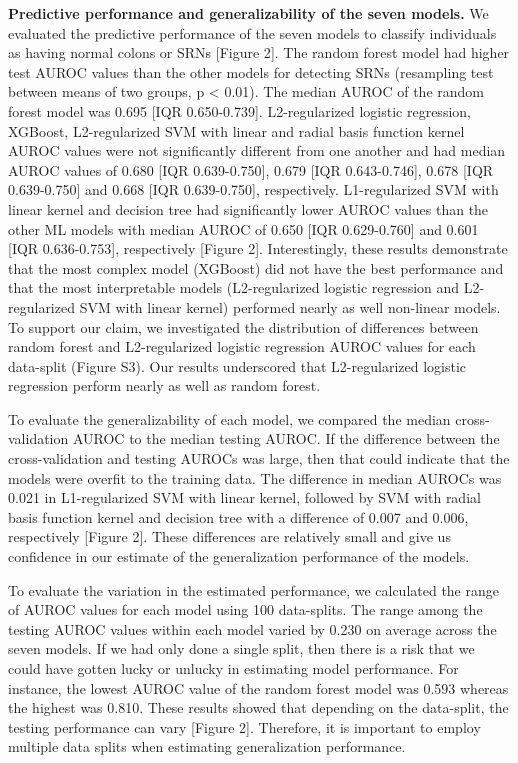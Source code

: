 \documentclass[11pt,]{article}
\begin{document}
\textbf{Predictive performance and generalizability of the seven
models.} We evaluated the predictive performance of the seven models to
classify individuals as having normal colons or SRNs {[}Figure 2{]}. The
random forest model had higher test AUROC values than the other models
for detecting SRNs (resampling test between means of two groups, p
\textless{} 0.01). The median AUROC of the random forest model was 0.695
{[}IQR 0.650-0.739{]}. L2-regularized logistic regression, XGBoost,
L2-regularized SVM with linear and radial basis function kernel AUROC
values were not significantly different from one another and had median
AUROC values of 0.680 {[}IQR 0.639-0.750{]}, 0.679 {[}IQR
0.643-0.746{]}, 0.678 {[}IQR 0.639-0.750{]} and 0.668 {[}IQR
0.639-0.750{]}, respectively. L1-regularized SVM with linear kernel and
decision tree had significantly lower AUROC values than the other ML
models with median AUROC of 0.650 {[}IQR 0.629-0.760{]} and 0.601 {[}IQR
0.636-0.753{]}, respectively {[}Figure 2{]}. Interestingly, these
results demonstrate that the most complex model (XGBoost) did not have
the best performance and that the most interpretable models
(L2-regularized logistic regression and L2-regularized SVM with linear
kernel) performed nearly as well non-linear models. To support our
claim, we investigated the distribution of differences between random
forest and L2-regularized logistic regression AUROC values for each
data-split (Figure S3). Our results underscored that L2-regularized
logistic regression perform nearly as well as random forest.

To evaluate the generalizability of each model, we compared the median
cross-validation AUROC to the median testing AUROC. If the difference
between the cross-validation and testing AUROCs was large, then that
could indicate that the models were overfit to the training data. The
difference in median AUROCs was 0.021 in L1-regularized SVM with linear
kernel, followed by SVM with radial basis function kernel and decision
tree with a difference of 0.007 and 0.006, respectively {[}Figure 2{]}.
These differences are relatively small and give us confidence in our
estimate of the generalization performance of the models.

To evaluate the variation in the estimated performance, we calculated
the range of AUROC values for each model using 100 data-splits. The
range among the testing AUROC values within each model varied by 0.230
on average across the seven models. If we had only done a single split,
then there is a risk that we could have gotten lucky or unlucky in
estimating model performance. For instance, the lowest AUROC value of
the random forest model was 0.593 whereas the highest was 0.810. These
results showed that depending on the data-split, the testing performance
can vary {[}Figure 2{]}. Therefore, it is important to employ multiple
data splits when estimating generalization performance.
\end{document}
